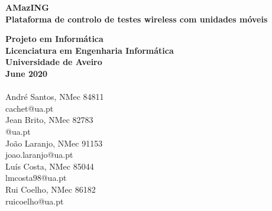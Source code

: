 \thispagestyle{empty} %
\vspace*{\fill}
\sffamily

\Large{
\noindent
\textbf{AMazING}\\
\textbf{Plataforma de controlo de testes wireless com unidades móveis}\\
}

\small
\noindent
\textbf{Projeto em Informática}\\
\textbf{Licenciatura em Engenharia Informática}\\
\textbf{Universidade de Aveiro}\\
\textbf{June 2020}\\
\\
André Santos, NMec 84811\\
cachet@ua.pt\\
Jean Brito, NMec 82783\\
@ua.pt\\
João Laranjo, NMec 91153\\
joao.laranjo@ua.pt\\
Luís Costa, NMec 85044\\
lmcosta98@ua.pt\\
Rui Coelho, NMec 86182\\
ruicoelho@ua.pt
\normalsize
\normalfont
\vspace*{2.5cm}

